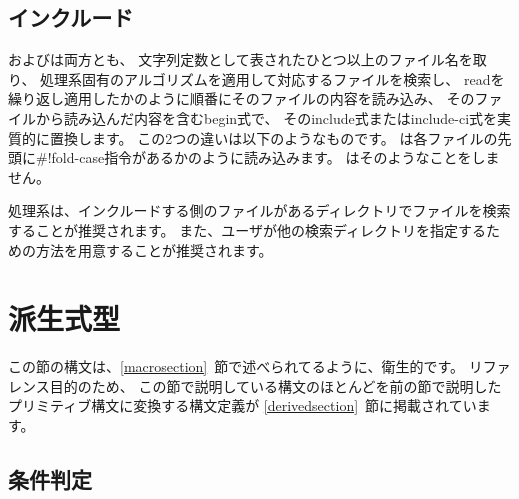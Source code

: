 \subsection{インクルード}\unsection
\label{inclusion}
\begin{entry}{%
}

\semantics
{}およびは両方とも、
文字列定数として表されたひとつ以上のファイル名を取り、
処理系固有のアルゴリズムを適用して対応するファイルを検索し、
{\cf read}を繰り返し適用したかのように順番にそのファイルの内容を読み込み、
そのファイルから読み込んだ内容を含む{\cf begin}式で、
その{\cf include}式または{\cf include-ci}式を実質的に置換します。
この2つの違いは以下のようなものです。
は各ファイルの先頭に{\cf{}\#!fold-case}指令があるかのように読み込みます。
はそのようなことをしません。

\begin{note}
処理系は、インクルードする側のファイルがあるディレクトリでファイルを検索することが推奨されます。
また、ユーザが他の検索ディレクトリを指定するための方法を用意することが推奨されます。
\end{note}

\end{entry}

\section{派生式型}
\label{derivedexps}

この節の構文は、\ref{macrosection}~節で述べられてるように、衛生的です。
リファレンス目的のため、
この節で説明している構文のほとんどを前の節で説明したプリミティブ構文に変換する構文定義が
\ref{derivedsection}~節に掲載されています。


\subsection{条件判定}\unsection


